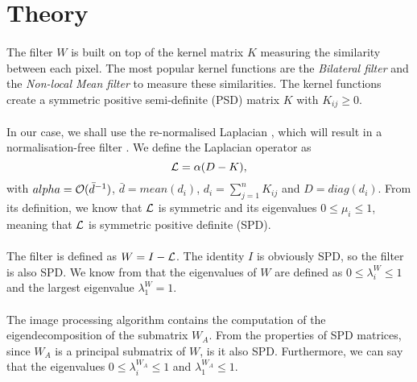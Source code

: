 \section{Theory}

\paragraph{}
The filter \(W\) is built on top of the kernel matrix \(K\) measuring the similarity between each pixel.
The most popular kernel functions are the \textit{Bilateral filter} \cite{bilateral_tomasi_1998} and the \textit{Non-local Mean filter} \cite{kervrann_nlm_2006} to measure these similarities.
The kernel functions create a symmetric positive semi-definite (PSD) matrix $K$ with \(K_{ij} \ge 0\).

\paragraph{}
In our case, we shall use the re-normalised Laplacian \cite{siam_slides_2016}, which will result in a normalisation-free filter \cite{milanfar_new_2016}.
We define the Laplacian operator as
\[\operatorname{\mathcal{L}} = \alpha (D - K),\]
with \(alpha = \operatorname{\mathcal{O}} (\bar{d}^{-1})\), \(\bar{d} = mean(d_i)\), \(d_i = \sum^n_{j=1} K_{ij}\) and \(D = diag(d_i)\).
From its definition, we know that \(\operatorname{\mathcal{L}}\) is symmetric and its eigenvalues \(0 \le \mu_i \le 1\), meaning that \(\operatorname{\mathcal{L}}\) is symmetric positive definite (SPD).

\paragraph{}
The filter is defined as \(W = I - \operatorname{\mathcal{L}}\). The identity \(I\) is obviously SPD, so the filter is also SPD.
We know from \cite{glide_2014} that the eigenvalues of \(W\) are defined as \(0 \le \lambda^W_i \le 1\) and the largest eigenvalue \(\lambda^W_1 = 1\).

\paragraph{}
The image processing algorithm contains the computation of the eigendecomposition of the submatrix \(W_A\).
From the properties of SPD matrices, since \(W_A\) is a principal submatrix of \(W\), is it also SPD.
Furthermore, we can say that the eigenvalues \(0 \le \lambda^{W_A}_i \le 1\) and \(\lambda^{W_A}_1 \le 1\).

